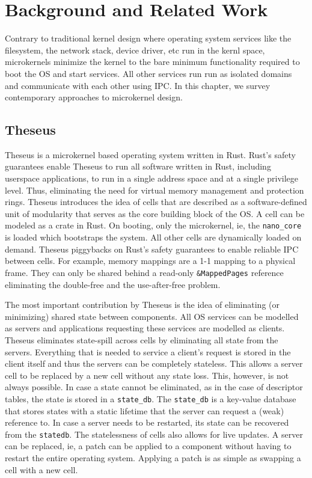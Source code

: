 
\chapter{Background and Related Work}

\label{Chapter2}

Contrary to traditional kernel design where operating system services like the filesystem, the network stack, device driver, etc run in the kernl space, microkernels minimize the kernel to the bare minimum functionality required to boot the OS and start services. All other services run run as isolated domains and communicate with each other using IPC. In this chapter, we survey contemporary approaches to microkernel design.

\section{Theseus}
Theseus\cite{theseus} is a microkernel based operating system written in Rust. Rust's safety guarantees enable Theseus to run all software written in Rust, including userspace applications, to run in a single address space and at a single privilege level. Thus, eliminating the need for virtual memory management and protection rings. Theseus introduces the idea of cells that are described as a software-defined unit of modularity that serves as the core building block of the OS. A cell can be modeled as a crate in Rust. On booting, only the microkernel, ie, the \lstinline{nano_core} is loaded which bootstraps the system. All other cells are dynamically loaded on demand. 
Theseus piggybacks on Rust's safety guarantees to enable reliable IPC between cells. For example, memory mappings are a 1-1 mapping to a physical frame. They can only be shared behind a read-only \lstinline{&MappedPages} reference eliminating the double-free and the use-after-free problem. 

The most important contribution by Theseus is the idea of eliminating (or minimizing) shared state between components. All OS services can be modelled as servers and applications requesting these services are modelled as clients. Theseus eliminates state-spill\cite{state-spill} across cells by eliminating all state from the servers. Everything that is needed to service a client's request is stored in the client itself and thus the servers can be completely stateless. This allows a server cell to be replaced by a new cell without any state loss. This, however, is not always possible. In case a state cannot be eliminated, as in the case of descriptor tables, the state is stored in a \lstinline{state_db}. The \lstinline{state_db} is a key-value database that stores states with a static lifetime that the server can request a (weak) reference to. In case a server needs to be restarted, its state can be recovered from the \lstinline{statedb}. The statelessness of cells also allows for live updates. A server can be replaced, ie, a patch can be applied to a component without having to restart the entire operating system. Applying a patch is as simple as swapping a cell with a new cell.

